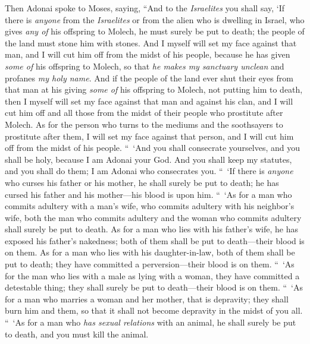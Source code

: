 \begin{biblechapter} %
 Then Adonai spoke to Moses, saying,
\verse “And to the \textit{Israelites} you shall say, ‘If there is \textit{anyone} from the \textit{Israelites} or from the alien who is dwelling in Israel, who gives \textit{any of} his offspring to Molech, he must surely be put to death; the people of the land must stone him with stones.
\verse And I myself will set my face against that man, and I will cut him off from the midst of his people, because he has given \textit{some of} his offspring to Molech, so that \textit{he makes my sanctuary unclean} and profanes \textit{my holy name}.
\verse And if the people of the land ever shut their eyes from that man at his giving \textit{some of} his offspring to Molech, not putting him to death,
\verse then I myself will set my face against that man and against his clan, and I will cut him off and all those from the midst of their people who prostitute after Molech.
\verse As for the person who turns to the mediums and the soothsayers to prostitute after them, I will set my face against that person, and I will cut him off from the midst of his people.
\verse “ ‘And you shall consecrate yourselves, and you shall be holy, because I am Adonai your God.
\verse And you shall keep my statutes, and you shall do them; I am Adonai who consecrates you.
 “ ‘If there is \textit{anyone} who curses his father or his mother, he shall surely be put to death; he has cursed his father and his mother—his blood is upon him.
\verse “ ‘As for a man who commits adultery with a man’s wife, who commits adultery with his neighbor’s wife, both the man who commits adultery and the woman who commits adultery shall surely be put to death.
\verse As for a man who lies with his father’s wife, he has exposed his father’s nakedness; both of them shall be put to death—their blood is on them.
\verse As for a man who lies with his daughter-in-law, both of them shall be put to death; they have committed a perversion—their blood is on them.
\verse “ ‘As for the man who lies with a male as lying with a woman, they have committed a detestable thing; they shall surely be put to death—their blood is on them.
\verse “ ‘As for a man who marries a woman and her mother, that is depravity; they shall burn him and them, so that it shall not become depravity in the midst of you all.
\verse “ ‘As for a man who \textit{has sexual relations} with an animal, he shall surely be put to death, and you must kill the animal.

\end{biblechapter}
